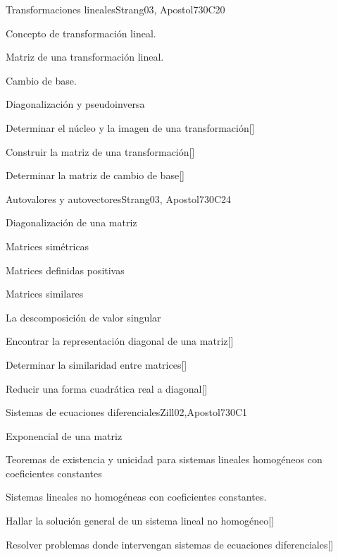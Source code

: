 \begin{syllabus}
\begin{unit}{}{Transformaciones lineales}{Strang03, Apostol73}{0}{C20}
\begin{topics}
      \item Concepto de transformación lineal.
      \item Matriz de una transformación lineal.
      \item Cambio de base.
      \item Diagonalización y pseudoinversa
   \end{topics}
   \begin{learningoutcomes}
      \item Determinar el núcleo y la imagen de una transformación[\Usage]
      \item Construir la matriz de una transformación[\Usage]
      \item Determinar la matriz de cambio de base[\Usage]
      \end{learningoutcomes}
\end{unit}

\begin{unit}{}{Autovalores y autovectores}{Strang03, Apostol73}{0}{C24}
\begin{topics}
      \item Diagonalización de una matriz
      \item Matrices simétricas
      \item Matrices definidas positivas
      \item Matrices similares
      \item La descomposición de valor singular
  \end{topics}
 \begin{learningoutcomes}
      \item Encontrar la representación diagonal de una matriz[\Usage]
      \item Determinar la similaridad entre matrices[\Usage]
      \item Reducir una forma cuadrática real a diagonal[\Usage]
   \end{learningoutcomes}
\end{unit}

\begin{unit}{}{Sistemas de ecuaciones diferenciales}{Zill02,Apostol73}{0}{C1}
\begin{topics}
      \item Exponencial de una matriz
      \item Teoremas de existencia y unicidad para sistemas lineales homogéneos con coeficientes constantes
      \item Sistemas lineales no homogéneas con coeficientes constantes.
   \end{topics}
\begin{learningoutcomes}
      \item Hallar la solución general de un sistema lineal no  homogéneo[\Usage]
      \item Resolver problemas donde intervengan sistemas de ecuaciones diferenciales[\Usage]
   \end{learningoutcomes}
\end{unit}


\end{syllabus}
